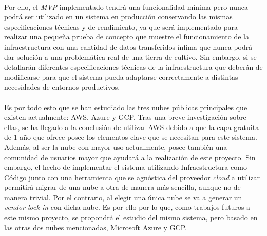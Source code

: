 \documentclass[../../memoria.tex]{subfiles}
\begin{document}
\paragraph{}
Por ello, el \textit{MVP} implementado tendrá una funcionalidad mínima pero nunca podrá ser utilizado en un sistema en producción conservando las mismas especificaciones técnicas y de rendimiento, ya que será implementado para realizar una pequeña prueba de concepto que muestre el funcionamiento de la infraestructura con una cantidad de datos transferidos ínfima que nunca podrá dar solución a una problemática real de una tierra de cultivo. Sin embargo, si se detallarán diferentes especificaciones técnicas de la infraestructura que deberán de modificarse para que el sistema pueda adaptarse correctamente a distintas necesidades de entornos productivos.

\paragraph{}
Es por todo esto que se han estudiado las tres nubes públicas principales que existen actualmente: AWS, Azure y GCP. Tras una breve investigación sobre ellas, se ha llegado a la conclusión de utilizar AWS debido a que la capa gratuita de 1 año que ofrece posee los elementos clave que se necesitan para este sistema. Además, al ser la nube con mayor uso actualmente, posee también una comunidad de usuarios mayor que ayudará a la realización de este proyecto. Sin embargo, el hecho de implementar el sistema utilizando Infraestructura como Código junto con una herramienta que se agnóstica del proveedor \textit{cloud} a utilizar permitirá migrar de una nube a otra de manera más sencilla, aunque no de manera trivial. Por el contrario, al elegir una única nube se va a generar un \textit{vendor lock-in} con dicha nube. Es por ello por lo que, como trabajos futuros a este mismo proyecto, se propondrá el estudio del mismo sistema, pero basado en las otras dos nubes mencionadas, Microsoft Azure y GCP.
\end{document}
